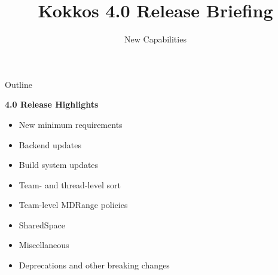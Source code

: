 
\usepackage{tikz}
\graphicspath{{4_0/figures/}}

\title{Kokkos 4.0 Release Briefing}

\author{New Capabilities}




\shorttrue
\mediumfalse
\fullfalse



\begin{frame}
        \titlepage
\end{frame}


\begin{frame}[fragile]{Outline}

\textbf{4.0 Release Highlights}

    \begin{itemize}
      \item{New minimum requirements}
      \item{Backend updates}
      \item{Build system updates}
      \item{Team- and thread-level sort}
      \item{Team-level MDRange policies}
      \item{SharedSpace}
      \item{Miscellaneous}
      \item{Deprecations and other breaking changes}
    \end{itemize}

\end{frame}

